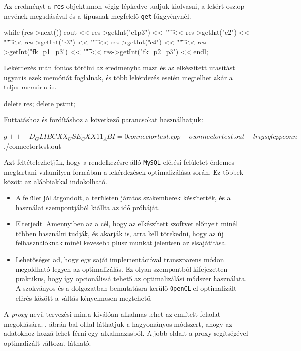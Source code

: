 Az eredményt a \texttt{res} objektumon végig lépkedve tudjuk kiolvasni, a lekért oszlop nevének megadásával és a típusnak megfelelő \texttt{get} függvénynél.
\begin{cpp}
while (res->next())
cout << res->getInt("c1p3") << "\t" << res->getInt("c2") << "\t"
<< res->getInt("c3") << "\t" << res->getInt("c4") << "\t"
<< res->getInt("fk_p1_p3") << "\t" << res->getInt("fk_p2_p3") 
<< endl;
\end{cpp}
Lekérdezés után fontos törölni az eredményhalmazt és az elkészített utasítást, ugyanis ezek memóriát foglalnak, és több lekérdezés esetén megtelhet akár a teljes memória is.
\begin{cpp}
delete res;
delete pstmt;
\end{cpp}
Futtatáshoz és fordításhoz a következő parancsokat használhatjuk: 
\begin{python}
$ g++ -D_GLIBCXX_USE_CXX11_ABI=0 connectortest.cpp 
-o connectortest.out -lmysqlcppconn
$ ./connectortest.out
\end{python}


Azt feltételezhetjük, hogy a rendelkezésre álló \texttt{MySQL} elérési felületet érdemes megtartani valamilyen formában a lekérdezések optimalizálása során. Ez többek között az alábbiakkal indokolható.
\begin{itemize}
	\item A felület jól átgondolt, a területen járatos szakemberek készítették, és a használat szempontjából kiállta az idő próbáját.
	\item Elterjedt. Amennyiben az a cél, hogy az elkészített szoftver előnyeit minél többen használni tudják, és akarják is, arra kell törekedni, hogy az új felhasználóknak minél kevesebb plusz munkát jelentsen az elsajátítása.
	\item Lehetőséget ad, hogy egy saját implementációval transzparens módon megoldható legyen az optimalizálás. Ez olyan szempontból kifejezetten praktikus, hogy így opcionálissá tehető az optimalizálási módszer használata. A szokványos és a dolgozatban bemutatásra kerülő \texttt{OpenCL}-el optimalizált elérés között a váltás kényelmesen megtehető.
\end{itemize}

A \textit{proxy} nevű tervezési minta kiválóan alkalmas lehet az említett feladat megoldására. . ábrán bal oldal láthatjuk a hagyományos módszert, ahogy az adatokhoz hozzá lehet férni egy alkalmazásból. A jobb oldalt a proxy segítségével optimalizált változat látható.


